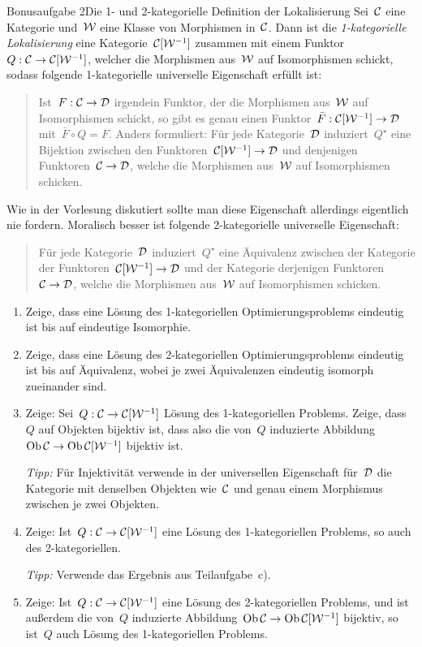 \documentclass{uebblatt}
\begin{document}
\begin{aufgabe*}{Bonusaufgabe 2}{Die 1- und 2-kategorielle Definition der Lokalisierung}
Sei~$\mathcal{C}$ eine Kategorie und~$\mathcal{W}$ eine Klasse von Morphismen in~$\mathcal{C}$. Dann ist
die \emph{1-kategorielle Lokalisierung} eine Kategorie~$\mathcal{C}[\mathcal{W}^{-1}]$ zusammen
mit einem Funktor~$Q : \mathcal{C} \to \mathcal{C}[\mathcal{W}^{-1}]$, welcher die Morphismen aus~$\mathcal{W}$ auf
Isomorphismen schickt, sodass folgende 1-kategorielle universelle Eigenschaft
erfüllt ist:
\begin{quote}Ist~$F : \mathcal{C} \to \mathcal{D}$ irgendein Funktor, der die Morphismen aus~$\mathcal{W}$
auf Isomorphismen schickt, so gibt es genau einen Funktor~$\bar F : \mathcal{C}[\mathcal{W}^{-1}]
\to \mathcal{D}$ mit~$\bar F \circ Q = F$. Anders formuliert: Für jede Kategorie~$\mathcal{D}$
induziert~$Q^\star$ eine Bijektion zwischen den Funktoren~$\mathcal{C}[\mathcal{W}^{-1}] \to \mathcal{D}$
und denjenigen Funktoren~$\mathcal{C} \to \mathcal{D}$, welche die Morphismen aus~$\mathcal{W}$ auf
Isomorphismen schicken.
\end{quote}
Wie in der Vorlesung diskutiert sollte man diese Eigenschaft allerdings
eigentlich nie fordern. Moralisch besser ist folgende 2-kategorielle
universelle Eigenschaft:
\begin{quote}
Für jede Kategorie~$\mathcal{D}$ induziert~$Q^\star$ eine Äquivalenz zwischen der
Kategorie der Funktoren~$\mathcal{C}[\mathcal{W}^{-1}] \to \mathcal{D}$ und der Kategorie derjenigen
Funktoren~$\mathcal{C} \to \mathcal{D}$, welche die Morphismen aus~$\mathcal{W}$ auf Isomorphismen
schicken.
\end{quote}
\begin{enumerate}
\item Zeige, dass eine Lösung des 1-kategoriellen Optimierungsproblems
eindeutig ist bis auf eindeutige Isomorphie.
\item Zeige, dass eine Lösung des 2-kategoriellen Optimierungsproblems
eindeutig ist bis auf Äquivalenz, wobei je zwei Äquivalenzen eindeutig isomorph
zueinander sind.
\item Zeige: Sei~$Q : \mathcal{C} \to \mathcal{C}[\mathcal{W}^{-1}]$ Lösung des 1-kategoriellen Problems.
Zeige, dass~$Q$ auf Objekten bijektiv ist, dass also die von~$Q$ induzierte
Abbildung~$\operatorname{Ob} \mathcal{C} \to \operatorname{Ob} \mathcal{C}[\mathcal{W}^{-1}]$ bijektiv ist.

\emph{Tipp:} Für Injektivität verwende in der universellen Eigenschaft für~$\mathcal{D}$
die Kategorie mit denselben Objekten wie~$\mathcal{C}$ und genau einem Morphismus
zwischen je zwei Objekten.
\item Zeige: Ist~$Q : \mathcal{C} \to \mathcal{C}[\mathcal{W}^{-1}]$ eine Lösung des 1-kategoriellen
Problems, so auch des 2-kategoriellen.

\emph{Tipp:} Verwende das Ergebnis aus Teilaufgabe~c).
\item Zeige: Ist~$Q : \mathcal{C} \to \mathcal{C}[\mathcal{W}^{-1}]$ eine Lösung des 2-kategoriellen
Problems, und ist außerdem die von~$Q$ induzierte Abbildung~$\operatorname{Ob} \mathcal{C} \to \operatorname{Ob}
\mathcal{C}[\mathcal{W}^{-1}]$ bijektiv, so ist~$Q$ auch Lösung des 1-kategoriellen Problems.
\end{enumerate}
\end{aufgabe*}
\end{document}
